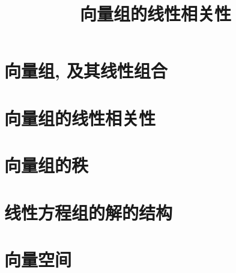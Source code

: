 \documentclass[UTF8]{ctexart}
\title{向量组的线性相关性}
\begin{document}
	\tableofcontents %
	\date{} %
	\maketitle  %
	
	
	\part{向量组, 及其线性组合}
	
	\part{向量组的线性相关性}
	
	\part{向量组的秩}
	
	\part{线性方程组的解的结构}
	
	\part{向量空间}
	

	
\end{document}

